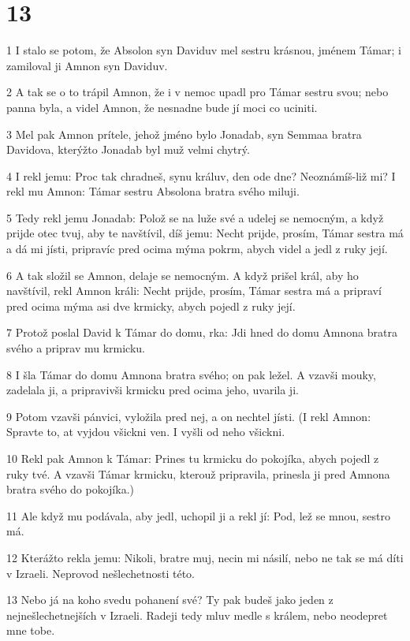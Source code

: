 \chapter{13}

\par 1 I stalo se potom, že Absolon syn Daviduv mel sestru krásnou, jménem Támar; i zamiloval ji Amnon syn Daviduv.
\par 2 A tak se o to trápil Amnon, že i v nemoc upadl pro Támar sestru svou; nebo panna byla, a videl Amnon, že nesnadne bude jí moci co uciniti.
\par 3 Mel pak Amnon prítele, jehož jméno bylo Jonadab, syn Semmaa bratra Davidova, kterýžto Jonadab byl muž velmi chytrý.
\par 4 I rekl jemu: Proc tak chradneš, synu králuv, den ode dne? Neoznámíš-liž mi? I rekl mu Amnon: Támar sestru Absolona bratra svého miluji.
\par 5 Tedy rekl jemu Jonadab: Polož se na luže své a udelej se nemocným, a když prijde otec tvuj, aby te navštívil, díš jemu: Necht prijde, prosím, Támar sestra má a dá mi jísti, pripravíc pred ocima mýma pokrm, abych videl a jedl z ruky její.
\par 6 A tak složil se Amnon, delaje se nemocným. A když prišel král, aby ho navštívil, rekl Amnon králi: Necht prijde, prosím, Támar sestra má a pripraví pred ocima mýma asi dve krmicky, abych pojedl z ruky její.
\par 7 Protož poslal David k Támar do domu, rka: Jdi hned do domu Amnona bratra svého a priprav mu krmicku.
\par 8 I šla Támar do domu Amnona bratra svého; on pak ležel. A vzavši mouky, zadelala ji, a pripravivši krmicku pred ocima jeho, uvarila ji.
\par 9 Potom vzavši pánvici, vyložila pred nej, a on nechtel jísti. (I rekl Amnon: Spravte to, at vyjdou všickni ven. I vyšli od neho všickni.
\par 10 Rekl pak Amnon k Támar: Prines tu krmicku do pokojíka, abych pojedl z ruky tvé. A vzavši Támar krmicku, kterouž pripravila, prinesla ji pred Amnona bratra svého do pokojíka.)
\par 11 Ale když mu podávala, aby jedl, uchopil ji a rekl jí: Pod, lež se mnou, sestro má.
\par 12 Kterážto rekla jemu: Nikoli, bratre muj, necin mi násilí, nebo ne tak se má díti v Izraeli. Neprovod nešlechetnosti této.
\par 13 Nebo já na koho svedu pohanení své? Ty pak budeš jako jeden z nejnešlechetnejších v Izraeli. Radeji tedy mluv medle s králem, nebo neodepret mne tobe.
